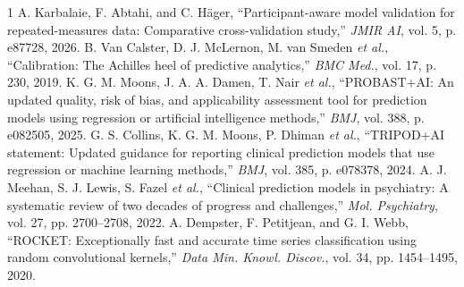 \documentclass[journal]{IEEEtran}
\begin{document}
\begin{thebibliography}{1}
 A. Karbalaie, F. Abtahi, and C. H\"ager, ``Participant-aware model validation for repeated-measures data: Comparative cross-validation study,'' \emph{JMIR AI}, vol. 5, p. e87728, 2026.
 B. Van Calster, D. J. McLernon, M. van Smeden \emph{et al.}, ``Calibration: The Achilles heel of predictive analytics,'' \emph{BMC Med.}, vol. 17, p. 230, 2019.
 K. G. M. Moons, J. A. A. Damen, T. Nair \emph{et al.}, ``PROBAST+AI: An updated quality, risk of bias, and applicability assessment tool for prediction models using regression or artificial intelligence methods,'' \emph{BMJ}, vol. 388, p. e082505, 2025.
 G. S. Collins, K. G. M. Moons, P. Dhiman \emph{et al.}, ``TRIPOD+AI statement: Updated guidance for reporting clinical prediction models that use regression or machine learning methods,'' \emph{BMJ}, vol. 385, p. e078378, 2024.
 A. J. Meehan, S. J. Lewis, S. Fazel \emph{et al.}, ``Clinical prediction models in psychiatry: A systematic review of two decades of progress and challenges,'' \emph{Mol. Psychiatry}, vol. 27, pp. 2700--2708, 2022.
 A. Dempster, F. Petitjean, and G. I. Webb, ``ROCKET: Exceptionally fast and accurate time series classification using random convolutional kernels,'' \emph{Data Min. Knowl. Discov.}, vol. 34, pp. 1454--1495, 2020.
\end{thebibliography}
\end{document}
